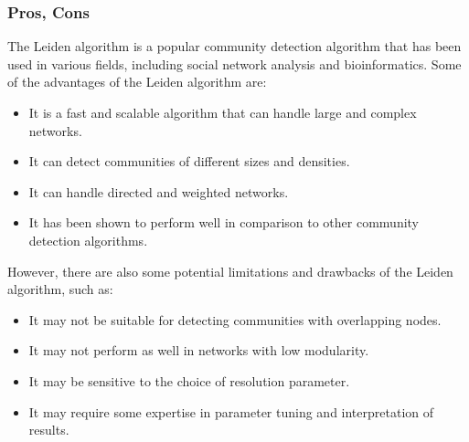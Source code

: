 \subsubsection{Pros, Cons}
The Leiden algorithm is a popular community detection algorithm that has been used in various fields, including social network analysis and bioinformatics. Some of the advantages of the Leiden algorithm are:
\begin{itemize}
    \item It is a fast and scalable algorithm that can handle large and complex networks.
    \item It can detect communities of different sizes and densities.
    \item It can handle directed and weighted networks.
    \item It has been shown to perform well in comparison to other community detection algorithms.
\end{itemize}
However, there are also some potential limitations and drawbacks of the Leiden algorithm, such as:
\begin{itemize}
    \item It may not be suitable for detecting communities with overlapping nodes.
    \item It may not perform as well in networks with low modularity.
    \item It may be sensitive to the choice of resolution parameter.
    \item It may require some expertise in parameter tuning and interpretation of results.
\end{itemize}
